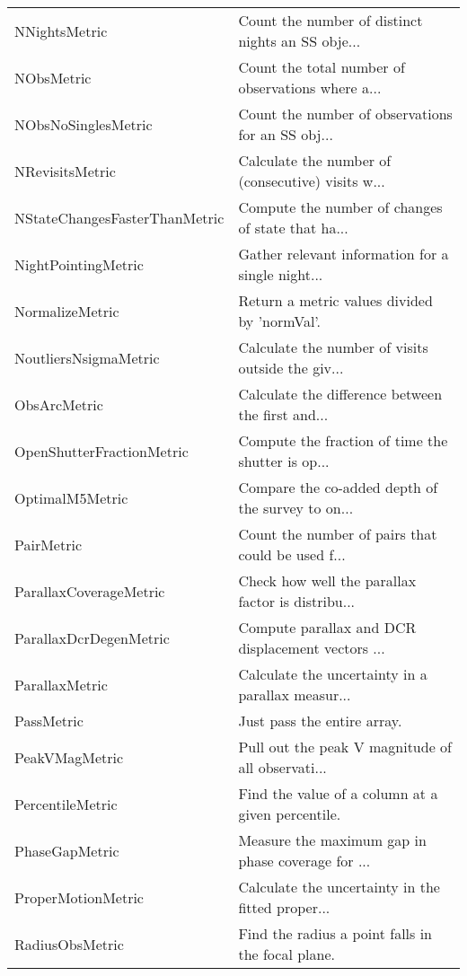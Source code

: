 \begin{tabular}{ll}
                 NNightsMetric &  Count the number of distinct nights an SS obje... \\
                    NObsMetric &  Count the total number of observations where a... \\
           NObsNoSinglesMetric &  Count the number of observations for an SS obj... \\
               NRevisitsMetric &  Calculate the number of (consecutive) visits w... \\
 NStateChangesFasterThanMetric &  Compute the number of changes of state that ha... \\
           NightPointingMetric &  Gather relevant information for a single night... \\
               NormalizeMetric &       Return a metric values divided by 'normVal'. \\
         NoutliersNsigmaMetric &  Calculate the number of visits outside the giv... \\
                  ObsArcMetric &  Calculate the difference between the first and... \\
     OpenShutterFractionMetric &  Compute the fraction of time the shutter is op... \\
               OptimalM5Metric &  Compare the co-added depth of the survey to on... \\
                    PairMetric &  Count the number of pairs that could be used f... \\
        ParallaxCoverageMetric &  Check how well the parallax factor is distribu... \\
        ParallaxDcrDegenMetric &  Compute parallax and DCR displacement vectors ... \\
                ParallaxMetric &  Calculate the uncertainty in a parallax measur... \\
                    PassMetric &                        Just pass the entire array. \\
                PeakVMagMetric &  Pull out the peak V magnitude of all observati... \\
              PercentileMetric &  Find the value of a column at a given percentile. \\
                PhaseGapMetric &  Measure the maximum gap in phase coverage for ... \\
            ProperMotionMetric &  Calculate the uncertainty in the fitted proper... \\
               RadiusObsMetric &  Find the radius a point falls in the focal plane. \\

\end{tabular}
